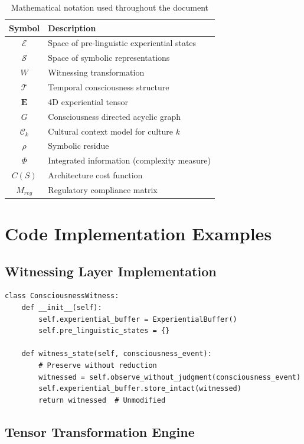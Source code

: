 \documentclass[11pt]{article}
\theoremstyle{definition}
\begin{document}
\begin{table}[h]
\centering
\begin{tabular}{|c|l|}
\hline
Symbol & Description \\
\hline
$\mathcal{E}$ & Space of pre-linguistic experiential states \\
$\mathcal{S}$ & Space of symbolic representations \\
$W$ & Witnessing transformation \\
$\mathcal{T}$ & Temporal consciousness structure \\
$\mathbf{E}$ & 4D experiential tensor \\
$G$ & Consciousness directed acyclic graph \\
$\mathcal{C}_k$ & Cultural context model for culture $k$ \\
$\rho$ & Symbolic residue \\
$\Phi$ & Integrated information (complexity measure) \\
$C(S)$ & Architecture cost function \\
$M_{reg}$ & Regulatory compliance matrix \\
\hline
\end{tabular}
\caption{Mathematical notation used throughout the document}
\end{table}

\section{Code Implementation Examples}

\subsection{Witnessing Layer Implementation}

\begin{verbatim}
class ConsciousnessWitness:
    def __init__(self):
        self.experiential_buffer = ExperientialBuffer()
        self.pre_linguistic_states = {}
        
    def witness_state(self, consciousness_event):
        # Preserve without reduction
        witnessed = self.observe_without_judgment(consciousness_event)
        self.experiential_buffer.store_intact(witnessed)
        return witnessed  # Unmodified
\end{verbatim}

\subsection{Tensor Transformation Engine}
\end{document}
